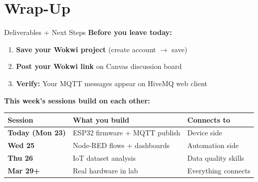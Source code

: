 \documentclass[aspectratio=169,11pt]{beamer}
\begin{document}
\section{Wrap-Up}

\begin{frame}{Deliverables + Next Steps}
    \textbf{Before you leave today:}

    \vspace{0.2cm}
    \begin{enumerate}
        \item \textbf{Save your Wokwi project} (create account $\rightarrow$ save)
        \item \textbf{Post your Wokwi link} on Canvas discussion board
        \item \textbf{Verify:} Your MQTT messages appear on HiveMQ web client
    \end{enumerate}

    \vspace{0.3cm}
    \textbf{This week's sessions build on each other:}

    \vspace{0.15cm}
    \begin{tabular}{lll}
        \toprule
        \textbf{Session} & \textbf{What you build} & \textbf{Connects to} \\
        \midrule
        \textbf{Today (Mon 23)} & ESP32 firmware + MQTT publish & Device side \\
        \textbf{Wed 25} & Node-RED flows + dashboards & Automation side \\
        \textbf{Thu 26} & IoT dataset analysis & Data quality skills \\
        \midrule
        \textbf{Mar 29+} & Real hardware in lab & Everything connects \\
        \bottomrule
    \end{tabular}

    \vspace{0.3cm}
\end{frame}
\end{document}
